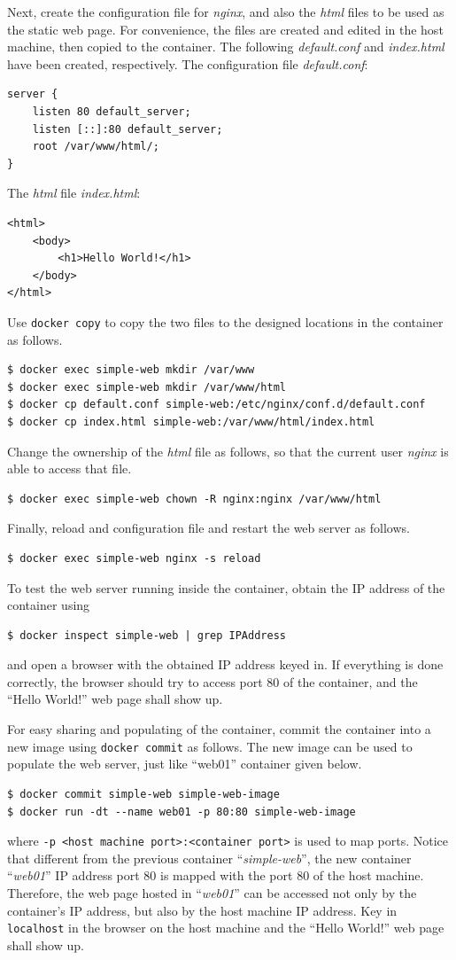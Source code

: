 Next, create the configuration file for \textit{nginx}, and also the \textit{html} files to be used as the static web page. For convenience, the files are created and edited in the host machine, then copied to the container. The following \textit{default.conf} and \textit{index.html} have been created, respectively. The configuration file \textit{default.conf}:
\begin{lstlisting}
server {
	listen 80 default_server;
	listen [::]:80 default_server;
	root /var/www/html/;
}
\end{lstlisting}
The \textit{html} file \textit{index.html}:
\begin{lstlisting}
<html>
	<body>
		<h1>Hello World!</h1>
	</body>
</html>
\end{lstlisting}
Use \verb|docker copy| to copy the two files to the designed locations in the container as follows.
\begin{lstlisting}
$ docker exec simple-web mkdir /var/www
$ docker exec simple-web mkdir /var/www/html
$ docker cp default.conf simple-web:/etc/nginx/conf.d/default.conf
$ docker cp index.html simple-web:/var/www/html/index.html
\end{lstlisting}
Change the ownership of the \textit{html} file as follows, so that the current user \textit{nginx} is able to access that file.
\begin{lstlisting}
$ docker exec simple-web chown -R nginx:nginx /var/www/html
\end{lstlisting}

Finally, reload and configuration file and restart the web server as follows.
\begin{lstlisting}
$ docker exec simple-web nginx -s reload
\end{lstlisting}

To test the web server running inside the container, obtain the IP address of the container using
\begin{lstlisting}
$ docker inspect simple-web | grep IPAddress
\end{lstlisting}
and open a browser with the obtained IP address keyed in. If everything is done correctly, the browser should try to access port 80 of the container, and the ``Hello World!'' web page shall show up.

For easy sharing and populating of the container, commit the container into a new image using \verb|docker commit| as follows. The new image can be used to populate the web server, just like ``web01'' container given below.
\begin{lstlisting}
$ docker commit simple-web simple-web-image
$ docker run -dt --name web01 -p 80:80 simple-web-image
\end{lstlisting}
where \verb|-p <host machine port>:<container port>| is used to map ports. Notice that different from the previous container ``\textit{simple-web}'', the new container ``\textit{web01}'' IP address port 80 is mapped with the port 80 of the host machine. Therefore, the web page hosted in ``\textit{web01}'' can be accessed not only by the container's IP address, but also by the host machine IP address. Key in \verb|localhost| in the browser on the host machine and the ``Hello World!'' web page shall show up.

